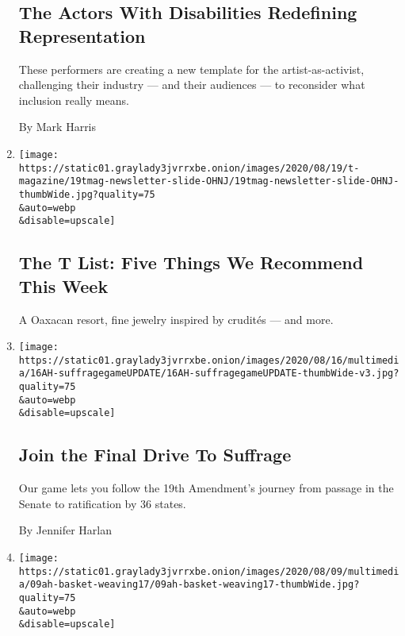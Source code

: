 \begin{enumerate}
  \hypertarget{the-actors-with-disabilities-redefining-representation}{%
  \subsection{The Actors With Disabilities Redefining
  Representation}\label{the-actors-with-disabilities-redefining-representation}}

  These performers are creating a new template for the
  artist-as-activist, challenging their industry --- and their audiences
  --- to reconsider what inclusion really means.

  By Mark Harris
\item
  \href{/2020/08/20/t-magazine/monte-uzulu-vivanterre-emme-parsons.html}{}

  \texttt{[image: https://static01.graylady3jvrrxbe.onion/images/2020/08/19/t-magazine/19tmag-newsletter-slide-OHNJ/19tmag-newsletter-slide-OHNJ-thumbWide.jpg?quality=75\\\&auto=webp\\\&disable=upscale]}

  \hypertarget{the-t-list-five-things-we-recommend-this-week-2}{%
  \subsection{The T List: Five Things We Recommend This
  Week}\label{the-t-list-five-things-we-recommend-this-week-2}}

  A Oaxacan resort, fine jewelry inspired by crudités --- and more.
\item
  \href{/2020/08/15/at-home/play-suffrage-game.html}{}

  \texttt{[image: https://static01.graylady3jvrrxbe.onion/images/2020/08/16/multimedia/16AH-suffragegameUPDATE/16AH-suffragegameUPDATE-thumbWide-v3.jpg?quality=75\\\&auto=webp\\\&disable=upscale]}

  \hypertarget{join-the-final-drive-to-suffrage}{%
  \subsection{Join the Final Drive To
  Suffrage}\label{join-the-final-drive-to-suffrage}}

  Our game lets you follow the 19th Amendment's journey from passage in
  the Senate to ratification by 36 states.

  By Jennifer Harlan
\item
  \href{/2020/08/08/at-home/coronavirus-newspaper-basket.html}{}

  \texttt{[image: https://static01.graylady3jvrrxbe.onion/images/2020/08/09/multimedia/09ah-basket-weaving17/09ah-basket-weaving17-thumbWide.jpg?quality=75\\\&auto=webp\\\&disable=upscale]}


\end{enumerate}
